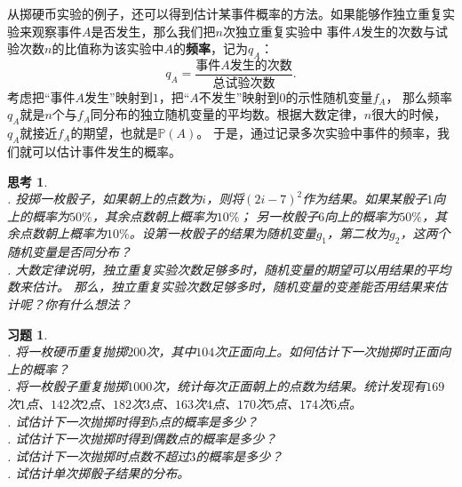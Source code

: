 \documentclass[12pt,UTF8]{ctexbook}
\theoremstyle{definition}
\theoremstyle{plain}
\newtheorem{sk}{思考}[section]
\newtheorem{xt}{习题}[section]
\begin{document}
从掷硬币实验的例子，还可以得到估计某事件概率的方法。如果能够作独立重复实验来观察事件$A$是否发生，那么我们把$n$次独立重复实验中
事件$A$发生的次数与试验次数$n$的比值称为该实验中$A$的\textbf{频率}，记为$q_A$：
$$ q_A = \frac{\mbox{事件}A\mbox{发生的次数}}{\mbox{总试验次数}}.$$
考虑把“事件$A$发生”映射到$1$，把“$A$不发生”映射到$0$的示性随机变量$f_A$，
那么频率$q_A$就是$n$个与$f_A$同分布的独立随机变量的平均数。根据大数定律，$n$很大的时候，$q_A$就接近$f_A$的期望，也就是$\mathbb{P}(A)$。
于是，通过记录多次实验中事件的频率，我们就可以估计事件发生的概率。

\begin{sk}
    \mbox{}\\
    . 投掷一枚骰子，如果朝上的点数为$i$，则将$(2i-7)^2$作为结果。如果某骰子$1$向上的概率为$50\%$，其余点数朝上概率为$10\%$；
    另一枚骰子$6$向上的概率为$50\%$，其余点数朝上概率为$10\%$。设第一枚骰子的结果为随机变量$g_1$，第二枚为$g_2$，这两个随机变量是否同分布？\\
    . 大数定律说明，独立重复实验次数足够多时，随机变量的期望可以用结果的平均数来估计。
    那么，独立重复实验次数足够多时，随机变量的变差能否用结果来估计呢？你有什么想法？
\end{sk}

\begin{xt}
    \mbox{}\\
    . 将一枚硬币重复抛掷$200$次，其中$104$次正面向上。如何估计下一次抛掷时正面向上的概率？\\
    . 将一枚骰子重复抛掷$1000$次，统计每次正面朝上的点数为结果。统计发现有$169$次$1$点、$142$次$2$点、$182$次$3$点、$163$次$4$点、$170$次$5$点、$174$次$6$点。\\
    . 试估计下一次抛掷时得到$5$点的概率是多少？\\
    . 试估计下一次抛掷时得到偶数点的概率是多少？\\
    . 试估计下一次抛掷时点数不超过$3$的概率是多少？\\
    . 试估计单次掷骰子结果的分布。
\end{xt}
\end{document}
